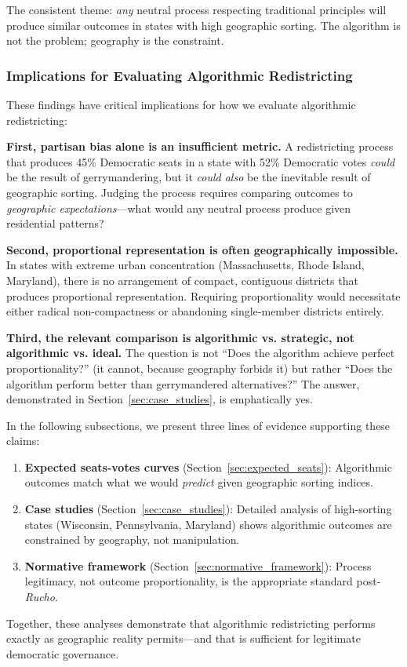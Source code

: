 The consistent theme: \textit{any} neutral process respecting traditional principles will produce similar outcomes in states with high geographic sorting. The algorithm is not the problem; geography is the constraint.

\subsubsection{Implications for Evaluating Algorithmic Redistricting}

These findings have critical implications for how we evaluate algorithmic redistricting:

\textbf{First, partisan bias alone is an insufficient metric.} A redistricting process that produces 45\% Democratic seats in a state with 52\% Democratic votes \textit{could} be the result of gerrymandering, but it \textit{could also} be the inevitable result of geographic sorting. Judging the process requires comparing outcomes to \textit{geographic expectations}---what would any neutral process produce given residential patterns?

\textbf{Second, proportional representation is often geographically impossible.} In states with extreme urban concentration (Massachusetts, Rhode Island, Maryland), there is no arrangement of compact, contiguous districts that produces proportional representation. Requiring proportionality would necessitate either radical non-compactness or abandoning single-member districts entirely.

\textbf{Third, the relevant comparison is algorithmic vs. strategic, not algorithmic vs. ideal.} The question is not ``Does the algorithm achieve perfect proportionality?'' (it cannot, because geography forbids it) but rather ``Does the algorithm perform better than gerrymandered alternatives?'' The answer, demonstrated in Section~\ref{sec:case_studies}, is emphatically yes.

In the following subsections, we present three lines of evidence supporting these claims:
\begin{enumerate}
\item \textbf{Expected seats-votes curves} (Section~\ref{sec:expected_seats}): Algorithmic outcomes match what we would \textit{predict} given geographic sorting indices.
\item \textbf{Case studies} (Section~\ref{sec:case_studies}): Detailed analysis of high-sorting states (Wisconsin, Pennsylvania, Maryland) shows algorithmic outcomes are constrained by geography, not manipulation.
\item \textbf{Normative framework} (Section~\ref{sec:normative_framework}): Process legitimacy, not outcome proportionality, is the appropriate standard post-\textit{Rucho}.
\end{enumerate}

Together, these analyses demonstrate that algorithmic redistricting performs exactly as geographic reality permits---and that is sufficient for legitimate democratic governance.
